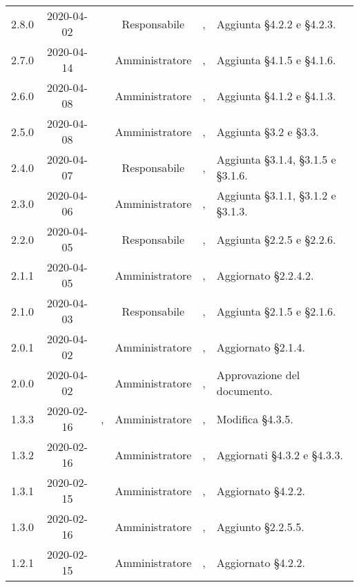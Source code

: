{\begin{longtable}{ c c  C{2.3cm} c C{3cm} C{3.2cm}}
2.8.0 & 2020-04-02 & \LD{} & Responsabile &  \AT{}, \PF{} & Aggiunta §4.2.2 e §4.2.3.  \\

2.7.0 & 2020-04-14 & \SE{} & Amministratore &  \AT{}, \PF{} & Aggiunta §4.1.5 e §4.1.6.  \\

2.6.0 & 2020-04-08 & \BR{} & Amministratore &  \AT{}, \PF{} & Aggiunta §4.1.2 e §4.1.3.  \\

2.5.0 & 2020-04-08 & \SE{} & Amministratore &  \AT{}, \PF{} & Aggiunta §3.2 e §3.3.  \\

2.4.0 & 2020-04-07 & \LD{} & Responsabile &  \AT{}, \PF{} & Aggiunta §3.1.4, §3.1.5 e §3.1.6.  \\

2.3.0 & 2020-04-06 & \SE{} & Amministratore &  \AT{}, \PF{} & Aggiunta §3.1.1, §3.1.2 e §3.1.3.  \\

2.2.0 & 2020-04-05 & \LD{} & Responsabile &  \AT{}, \PF{} & Aggiunta §2.2.5 e §2.2.6.  \\

2.1.1 & 2020-04-05 & \BR{} & Amministratore &  \AT{}, \PF{} & Aggiornato §2.2.4.2.  \\

2.1.0 & 2020-04-03 & \LD{} & Responsabile &  \AT{}, \PF{} & Aggiunta §2.1.5 e §2.1.6.  \\

2.0.1 & 2020-04-02 & \SE{} & Amministratore &  \AT{}, \PF{} & Aggiornato §2.1.4.  \\

2.0.0 & 2020-04-02 & \LD{} & Amministratore & \CE{}, \MC{} & Approvazione del documento. \\

1.3.3 & 2020-02-16 & \DF{}, \PF{} & Amministratore & \CE{}, \MC{} & Modifica §4.3.5. \\

1.3.2 & 2020-02-16 & \SE{} & Amministratore & \CE{}, \MC{} & Aggiornati §4.3.2 e §4.3.3. \\

1.3.1 & 2020-02-15 & \SE{} & Amministratore & \CE{}, \MC{} & Aggiornato §4.2.2. \\

1.3.0 & 2020-02-16 & \SE{} & Amministratore & \CE{}, \MC{} & Aggiunto §2.2.5.5. \\

1.2.1 & 2020-02-15 & \SE{} & Amministratore & \CE{}, \MC{} & Aggiornato §4.2.2. \\


\end{longtable}}
